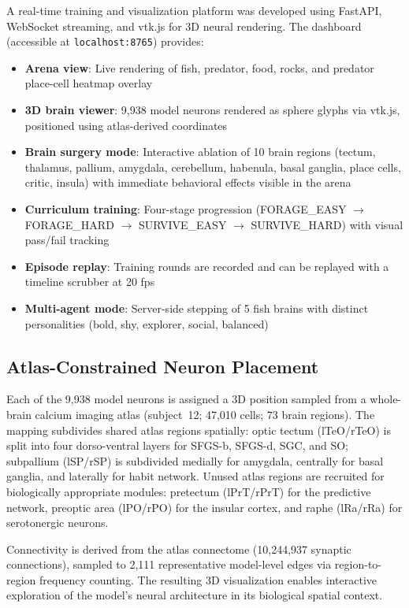 \documentclass[11pt,a4paper]{article}
\begin{document}
A real-time training and visualization platform was developed using FastAPI, WebSocket streaming, and vtk.js for 3D neural rendering. The dashboard (accessible at \texttt{localhost:8765}) provides:
\begin{itemize}
\item \textbf{Arena view}: Live rendering of fish, predator, food, rocks, and predator place-cell heatmap overlay
\item \textbf{3D brain viewer}: 9,938 model neurons rendered as sphere glyphs via vtk.js, positioned using atlas-derived coordinates
\item \textbf{Brain surgery mode}: Interactive ablation of 10 brain regions (tectum, thalamus, pallium, amygdala, cerebellum, habenula, basal ganglia, place cells, critic, insula) with immediate behavioral effects visible in the arena
\item \textbf{Curriculum training}: Four-stage progression (FORAGE\_EASY $\to$ FORAGE\_HARD $\to$ SURVIVE\_EASY $\to$ SURVIVE\_HARD) with visual pass/fail tracking
\item \textbf{Episode replay}: Training rounds are recorded and can be replayed with a timeline scrubber at 20 fps
\item \textbf{Multi-agent mode}: Server-side stepping of 5 fish brains with distinct personalities (bold, shy, explorer, social, balanced)
\end{itemize}

\subsection{Atlas-Constrained Neuron Placement}

Each of the 9,938 model neurons is assigned a 3D position sampled from a whole-brain calcium imaging atlas (subject~12; 47,010 cells; 73 brain regions). The mapping subdivides shared atlas regions spatially: optic tectum (lTeO/rTeO) is split into four dorso-ventral layers for SFGS-b, SFGS-d, SGC, and SO; subpallium (lSP/rSP) is subdivided medially for amygdala, centrally for basal ganglia, and laterally for habit network. Unused atlas regions are recruited for biologically appropriate modules: pretectum (lPrT/rPrT) for the predictive network, preoptic area (lPO/rPO) for the insular cortex, and raphe (lRa/rRa) for serotonergic neurons.

Connectivity is derived from the atlas connectome (10,244,937 synaptic connections), sampled to 2,111 representative model-level edges via region-to-region frequency counting. The resulting 3D visualization enables interactive exploration of the model's neural architecture in its biological spatial context.
\end{document}

